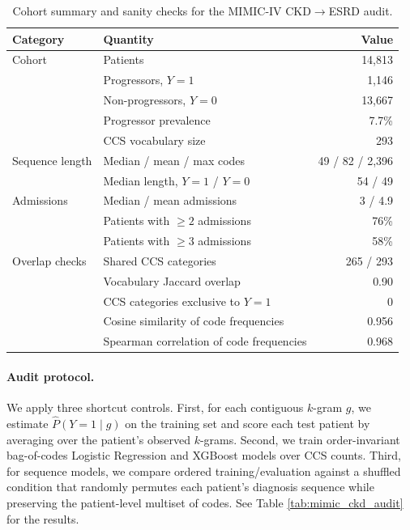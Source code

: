\documentclass{article}
\theoremstyle{plain}
\theoremstyle{definition}
\theoremstyle{remark}
\begin{document}
\begin{table}[t]
\centering
\caption{Cohort summary and sanity checks for the MIMIC-IV CKD$\to$ESRD audit.}
\label{tab:mimic_ckd_cohort}
\small
\setlength{\tabcolsep}{5pt}
\begin{tabular}{@{}llr@{}}
\toprule
Category & Quantity & Value \\
\midrule
Cohort & Patients & 14,813 \\
       & Progressors, $Y=1$ & 1,146 \\
       & Non-progressors, $Y=0$ & 13,667 \\
       & Progressor prevalence & 7.7\% \\
       & CCS vocabulary size & 293 \\
\midrule
Sequence length & Median / mean / max codes & 49 / 82 / 2,396 \\
                & Median length, $Y=1$ / $Y=0$ & 54 / 49 \\
\midrule
Admissions & Median / mean admissions & 3 / 4.9 \\
           & Patients with $\geq2$ admissions & 76\% \\
           & Patients with $\geq3$ admissions & 58\% \\
\midrule
Overlap checks & Shared CCS categories & 265 / 293 \\
               & Vocabulary Jaccard overlap & 0.90 \\
               & CCS categories exclusive to $Y=1$ & 0 \\
               & Cosine similarity of code frequencies & 0.956 \\
               & Spearman correlation of code frequencies & 0.968 \\
\bottomrule
\end{tabular}
\end{table}

\paragraph{Audit protocol.}
We apply three shortcut controls. First, for each contiguous $k$-gram $g$, we estimate $\hat P(Y=1\mid g)$ on the training set and score each test patient by averaging over the patient's observed $k$-grams. Second, we train order-invariant bag-of-codes Logistic Regression and XGBoost models over CCS counts. Third, for sequence models, we compare ordered training/evaluation against a shuffled condition that randomly permutes each patient's diagnosis sequence while preserving the patient-level multiset of codes. See Table \ref{tab:mimic_ckd_audit} for the results.
\end{document}
